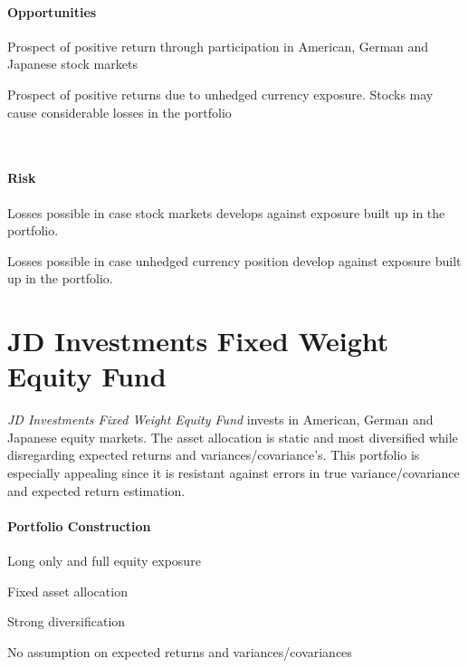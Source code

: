 \documentclass[11pt, parskip=full, DIV=14]{scrreprt}
\begin{document}
\begin{minipage}[t]{0.49\textwidth}
  \paragraph{Opportunities}
  \begin{sit}
  \item Prospect of positive return through participation in American, German and Japanese stock markets
  \item Prospect of positive returns due to unhedged currency exposure. Stocks may cause considerable losses in the portfolio
  \end{sit}
\end{minipage}
~~
\begin{minipage}[t]{0.49\textwidth}
  \paragraph{Risk}
  \begin{sit}
  \item Losses possible in case stock markets develops against exposure built up in the portfolio.
  \item Losses possible in case unhedged currency position develop against exposure built up in the portfolio.
  \end{sit}
\end{minipage}

\newpage\section*{JD Investments Fixed Weight Equity Fund }
\textit{JD Investments Fixed Weight Equity Fund} invests in American, German and Japanese equity markets. The asset allocation is static and most diversified while disregarding expected returns and variances/covariance’s. This portfolio is especially appealing since it is resistant against errors in true variance/covariance and expected return estimation.

\paragraph{Portfolio Construction}
\begin{sit}
\item	Long only and full equity exposure
\item	Fixed asset allocation
\item	Strong diversification
\item	No assumption on expected returns and variances/covariances
\end{sit}
\end{document}
